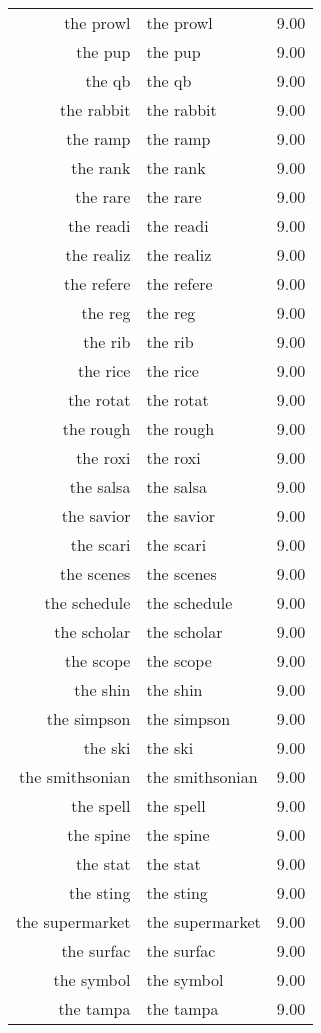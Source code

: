 \begin{table}[ht]
\begin{tabular}{rlr}
  the prowl & the prowl & 9.00 \\ 
  the pup & the pup & 9.00 \\ 
  the qb & the qb & 9.00 \\ 
  the rabbit & the rabbit & 9.00 \\ 
  the ramp & the ramp & 9.00 \\ 
  the rank & the rank & 9.00 \\ 
  the rare & the rare & 9.00 \\ 
  the readi & the readi & 9.00 \\ 
  the realiz & the realiz & 9.00 \\ 
  the refere & the refere & 9.00 \\ 
  the reg & the reg & 9.00 \\ 
  the rib & the rib & 9.00 \\ 
  the rice & the rice & 9.00 \\ 
  the rotat & the rotat & 9.00 \\ 
  the rough & the rough & 9.00 \\ 
  the roxi & the roxi & 9.00 \\ 
  the salsa & the salsa & 9.00 \\ 
  the savior & the savior & 9.00 \\ 
  the scari & the scari & 9.00 \\ 
  the scenes & the scenes & 9.00 \\ 
  the schedule & the schedule & 9.00 \\ 
  the scholar & the scholar & 9.00 \\ 
  the scope & the scope & 9.00 \\ 
  the shin & the shin & 9.00 \\ 
  the simpson & the simpson & 9.00 \\ 
  the ski & the ski & 9.00 \\ 
  the smithsonian & the smithsonian & 9.00 \\ 
  the spell & the spell & 9.00 \\ 
  the spine & the spine & 9.00 \\ 
  the stat & the stat & 9.00 \\ 
  the sting & the sting & 9.00 \\ 
  the supermarket & the supermarket & 9.00 \\ 
  the surfac & the surfac & 9.00 \\ 
  the symbol & the symbol & 9.00 \\ 
  the tampa & the tampa & 9.00 \\ 

\end{tabular}
\end{table}
